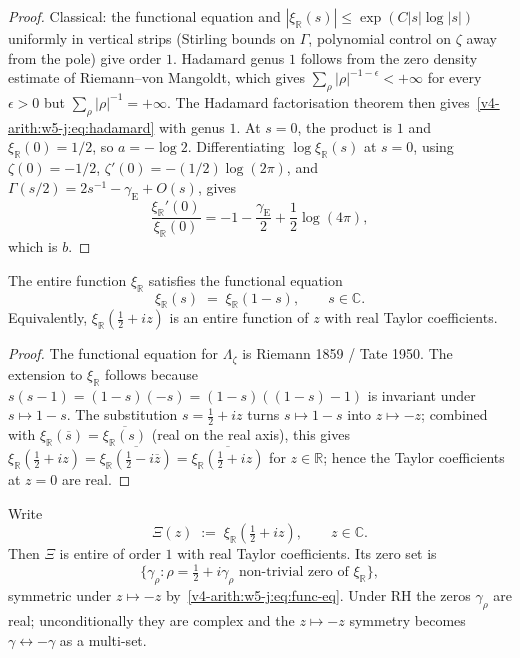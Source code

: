 \begin{proof}
Classical: the functional equation and
\(|\xi_{\mathbb R}(s)|\leq\exp(C|s|\log|s|)\) uniformly in vertical
strips (Stirling bounds on \(\Gamma\), polynomial control on
\(\zeta\) away from the pole) give order \(1\). Hadamard genus \(1\)
follows from the zero density estimate of Riemann--von Mangoldt,
which gives \(\sum_{\rho}|\rho|^{-1-\epsilon}<+\infty\) for every
\(\epsilon>0\) but
\(\sum_{\rho}|\rho|^{-1}=+\infty\). The Hadamard factorisation
theorem then gives~\eqref{v4-arith:w5-j:eq:hadamard} with genus \(1\).
At \(s=0\), the product is \(1\) and
\(\xi_{\mathbb R}(0)=1/2\), so \(a=-\log2\).  Differentiating
\(\log\xi_{\mathbb R}(s)\) at \(s=0\), using
\(\zeta(0)=-1/2\), \(\zeta'(0)=-(1/2)\log(2\pi)\), and
\(\Gamma(s/2)=2s^{-1}-\gamma_{\mathrm E}+O(s)\), gives
\[
\frac{\xi_{\mathbb R}'(0)}{\xi_{\mathbb R}(0)}
=-1-\frac{\gamma_{\mathrm E}}2+\frac12\log(4\pi),
\]
which is \(b\).
\end{proof}

\begin{proposition}
\label{v4-arith:w5-j:prop:func-eq}
The entire function
\(\xi_{\mathbb R}\) satisfies the functional equation
\begin{equation}
\label{v4-arith:w5-j:eq:func-eq}
\xi_{\mathbb R}(s)\;=\;\xi_{\mathbb R}(1-s),
\qquad s\in\mathbb{C}.
\end{equation}
Equivalently, \(\xi_{\mathbb R}(\tfrac{1}{2}+iz)\) is an entire
function of \(z\) with real Taylor coefficients.
\end{proposition}

\begin{proof}
The functional equation for \(\Lambda_{\zeta}\) is Riemann 1859 /
Tate 1950. The extension to \(\xi_{\mathbb R}\) follows because
\(s(s-1)=(1-s)(-s)=(1-s)((1-s)-1)\) is invariant under
\(s\mapsto 1-s\). The substitution \(s=\tfrac{1}{2}+iz\) turns
\(s\mapsto 1-s\) into \(z\mapsto -z\); combined with
\(\xi_{\mathbb R}(\overline{s})=\overline{\xi_{\mathbb R}(s)}\)
(real on the real axis), this gives
\(\xi_{\mathbb R}(\tfrac{1}{2}+iz)=\overline{\xi_{\mathbb R}(\tfrac{1}{2}-i\overline{z})}=\overline{\xi_{\mathbb R}(\tfrac{1}{2}+iz)}\)
for \(z\in\mathbb{R}\); hence the Taylor coefficients at \(z=0\) are real.
\end{proof}

\begin{definition}
\label{v4-arith:w5-j:def:shifted-character}
Write
\[
\Xi(z)\;:=\;\xi_{\mathbb R}\!\left(\tfrac{1}{2}+iz\right),
\qquad z\in\mathbb{C}.
\]
Then \(\Xi\) is entire of order \(1\) with real Taylor coefficients.
Its zero set is
\[
\{\gamma_{\rho}:\rho=\tfrac{1}{2}+i\gamma_{\rho}\text{ non-trivial zero of }\xi_{\mathbb R}\},
\]
symmetric under \(z\mapsto-z\) by~\eqref{v4-arith:w5-j:eq:func-eq}.
Under RH the zeros \(\gamma_{\rho}\) are real; unconditionally they
are complex and the \(z\mapsto-z\) symmetry becomes
\(\gamma\leftrightarrow-\gamma\) as a multi-set.
\end{definition}

